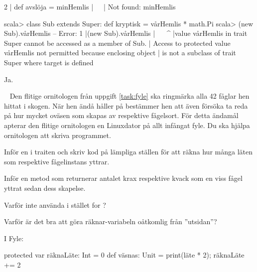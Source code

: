 \SOLUTION


\TaskSolved \what


\SubtaskSolved  
\begin{REPL}
2 |  def avslöja = minHemlis
  |                ^^^^^^^^^
  |                Not found: minHemlis
\end{REPL}

\SubtaskSolved  
\begin{REPL}
scala> class Sub extends Super:
         def kryptisk = vårHemlis * math.Pi
scala> (new Sub).vårHemlis
-- Error:
1 |(new Sub).vårHemlis
  |^^^^^^^^^^^^^^^^^^^
  |value vårHemlis in trait Super cannot be accessed as a member of Sub.
  | Access to protected value vårHemlis not permitted because enclosing object 
  | is not a subclass of trait Super where target is defined
\end{REPL}

\SubtaskSolved  Ja.


\QUESTEND







\QUESTBEGIN

\Task  \what~  Den flitige ornitologen från uppgift \ref{task:fyle} ska ringmärka alla 42 fåglar hen hittat i skogen. När hen ändå håller på bestämmer hen att även försöka ta reda på hur mycket oväsen som skapas av respektive fågelsort. För detta ändamål apterar den flitige ornitologen en Linuxdator på allt infångat fyle. Du ska hjälpa ornitologen att skriva programmet.

\Subtask Inför en  i traiten  och skriv kod på lämpliga ställen för att räkna hur många läten som respektive fågelinstans yttrar.

\Subtask Inför en metod  som returnerar antalet krax respektive kvack som en viss fågel yttrat sedan dess skapelse.

\Subtask Varför inte använda  i stället for ?

\Subtask Varför är det bra att göra räknar-variabeln oåtkomlig från ''utsidan''?



\SOLUTION


\TaskSolved \what


\SubtaskSolved  I Fyle:
\begin{Code}
protected var räknaLäte: Int = 0
def väsnas: Unit = { print(läte * 2); räknaLäte += 2 }
\end{Code}

